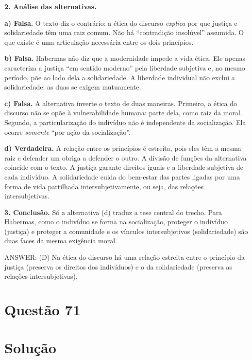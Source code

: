 \documentclass{article}%
\begin{document}
\textbf{2. Análise das alternativas.}

\textbf{a) Falsa.} O texto diz o contrário: a ética do discurso \emph{explica} por que justiça e solidariedade têm uma raiz comum. Não há ``contradição insolúvel'' assumida. O que existe é uma articulação necessária entre os dois princípios.

\textbf{b) Falsa.} Habermas não diz que a modernidade impede a vida ética. Ele apenas caracteriza a justiça ``em sentido moderno'' pela liberdade subjetiva e, no mesmo período, põe ao lado dela a solidariedade. A liberdade individual não exclui a solidariedade; as duas se exigem mutuamente.

\textbf{c) Falsa.} A alternativa inverte o texto de duas maneiras. Primeiro, a ética do discurso não se opõe à vulnerabilidade humana: parte dela, como raiz da moral. Segundo, a particularização do indivíduo não é independente da socialização. Ela ocorre \emph{somente} ``por ação da socialização''.

\textbf{d) Verdadeira.} A relação entre os princípios é estreita, pois eles têm a mesma raiz e defender um obriga a defender o outro. A divisão de funções da alternativa coincide com o texto. A justiça garante direitos iguais e a liberdade subjetiva de cada indivíduo. A solidariedade cuida do bem-estar das partes ligadas por uma forma de vida partilhada intersubjetivamente, ou seja, das relações intersubjetivas.

\textbf{3. Conclusão.} Só a alternativa (d) traduz a tese central do trecho. Para Habermas, como o indivíduo se forma na socialização, proteger o indivíduo (justiça) e proteger a comunidade e os vínculos intersubjetivos (solidariedade) são duas faces da mesma exigência moral.

ANSWER: (D) Na ética do discurso há uma relação estreita entre o princípio da justiça (preserva os direitos dos indivíduos) e o da solidariedade (preserva as relações intersubjetivas).%
\newpage%
\section*{Questão 71}

\section*{Solução}
\end{document}
